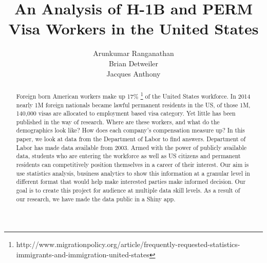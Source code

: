 \documentclass{article}\usepackage[]{graphicx}\usepackage[]{color}
\begin{document}
\title {An Analysis of H-1B and PERM Visa Workers in the United States}
\author{Arunkumar Ranganathan\\ Brian Detweiler\\ Jacques Anthony}

\maketitle

\begin{abstract}

Foreign born American workers make up 17\% \footnote {http://www.migrationpolicy.org/article/frequently-requested-statistics-immigrants-and-immigration-united-states} of the United States workforce. In 2014 nearly 1M foreign nationals became lawful permanent residents in the US, of those 1M, 140,000 visas are allocated to employment based visa category. Yet little has been published in the way of research. Where are these workers, and what do the demographics look like?
How does each company's compensation measure up? In this paper, we look at data from the Department of Labor to find answers. Department of Labor has made data available from 2003. Armed with the power of publicly available data, students who are entering the workforce as well as US citizens and permanent residents can competitively position themselves in a career of their interest.  Our aim is use statistics analysis, business analytics to show this information at a granular level in different format that would help make interested parties make informed decision. Our goal is to create this project for audience at multiple data skill levels. As a result of our research, we have made the data public in a Shiny app. 

\end{abstract}
\end{document}
